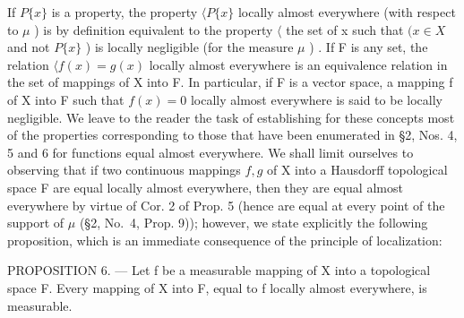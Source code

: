 If \(P\{x\}\) is a property, the property \(\langle P\{x\}\) locally almost everywhere (with respect to \(\mu\) ) is by definition equivalent to the property \(\langle\) the set of x such that \((x \in X\) and not \(P\{x\}\) ) is locally negligible (for the measure \(\mu\) ) . If F is any set, the relation \(\langle f(x) = g(x)\) locally almost everywhere is an equivalence relation in the set of mappings of X into F. In particular, if F is a vector space, a mapping f of X into F such that \(f(x) = 0\) locally almost everywhere is said to be locally negligible. We leave to the reader the task of establishing for these concepts most of the properties corresponding to those that have been enumerated in §2, Nos. 4, 5 and 6 for functions equal almost everywhere. We shall limit ourselves to observing that if two continuous mappings \(f, g\) of X into a Hausdorff topological space F are equal locally almost everywhere, then they are equal almost everywhere by virtue of Cor. 2 of Prop. 5 (hence are equal at every point of the support of \(\mu\) (§2, No.~4, Prop. 9)); however, we state explicitly the following proposition, which is an immediate consequence of the principle of localization:

PROPOSITION 6. --- Let f be a measurable mapping of X into a topological space F. Every mapping of X into F, equal to f locally almost everywhere, is measurable.

